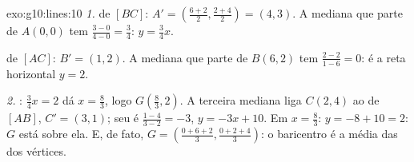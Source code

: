 \begin{solution}{exo:g10:lines:10}
\emph{1.}  de $[BC]$: $A' = \left(\frac{6+2}{2},
\frac{2+4}{2}\right) = (4, 3)$. A mediana que parte de $A(0,0)$ tem
 $\frac{3 - 0}{4 - 0} = \frac34$: 
$y = \frac34 x$.

 de $[AC]$: $B' = (1, 2)$. A mediana que parte de $B(6, 2)$
tem  $\frac{2 - 2}{1 - 6} = 0$: é a reta horizontal
$y = 2$.

\emph{2.} : $\frac34 x = 2$ dá $x = \frac83$, logo
$G\left(\frac83, 2\right)$. A terceira mediana liga $C(2,4)$ ao  de $[AB]$, $C' = (3, 1)$; seu  é
$\frac{1 - 4}{3 - 2} = -3$,  $y = -3x + 10$. Em $x = \frac83$:
$y = -8 + 10 = 2$: $G$ está sobre ela. E, de fato,
$G = \left(\frac{0 + 6 + 2}{3}, \frac{0 + 2 + 4}{3}\right)$: o
baricentro é a média das  dos vértices.
\end{solution}

